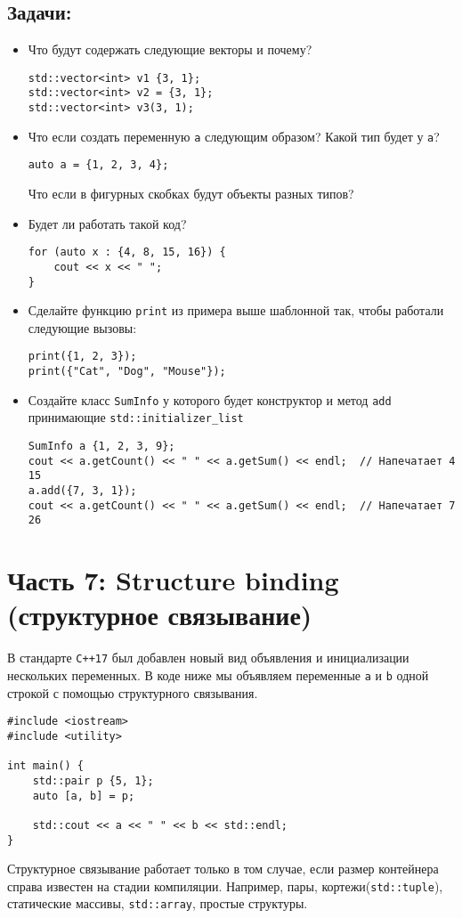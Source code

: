 \documentclass{article}
\begin{document}
\subsection*{Задачи:}
\begin{itemize}
\item Что будут содержать следующие векторы и почему?
\begin{lstlisting}
std::vector<int> v1 {3, 1};
std::vector<int> v2 = {3, 1};
std::vector<int> v3(3, 1);
\end{lstlisting}

\item Что если создать переменную \texttt{a} следующим образом? Какой тип будет у \texttt{a}?
\begin{lstlisting}
auto a = {1, 2, 3, 4};
\end{lstlisting}
Что если в фигурных скобках будут объекты разных типов?

\item Будет ли работать такой код?
\begin{lstlisting}
for (auto x : {4, 8, 15, 16}) {
    cout << x << " ";
}
\end{lstlisting}

\item Сделайте функцию \texttt{print} из примера выше шаблонной так, чтобы работали следующие вызовы:
\begin{lstlisting}
print({1, 2, 3});
print({"Cat", "Dog", "Mouse"});
\end{lstlisting}

\item Создайте класс \texttt{SumInfo} у которого будет конструктор и метод \texttt{add} принимающие \texttt{std::initializer\_list}
\begin{lstlisting}
SumInfo a {1, 2, 3, 9};
cout << a.getCount() << " " << a.getSum() << endl;  // Напечатает 4 15
a.add({7, 3, 1});
cout << a.getCount() << " " << a.getSum() << endl;  // Напечатает 7 26
\end{lstlisting}


\end{itemize}




\newpage
\section*{Часть 7: Structure binding (структурное связывание)}
В стандарте \texttt{C++17} был добавлен новый вид объявления и инициализации нескольких переменных. В коде ниже мы объявляем переменные \texttt{a} и \texttt{b} одной строкой с помощью структурного связывания.
\begin{lstlisting}
#include <iostream>
#include <utility>

int main() {
    std::pair p {5, 1};
    auto [a, b] = p;
    
    std::cout << a << " " << b << std::endl;
}
\end{lstlisting}
Структурное связывание работает только в том случае, если размер контейнера справа известен на стадии компиляции. Например, пары, кортежи(\texttt{std::tuple}), статические массивы, \texttt{std::array}, простые структуры.
\end{document}
